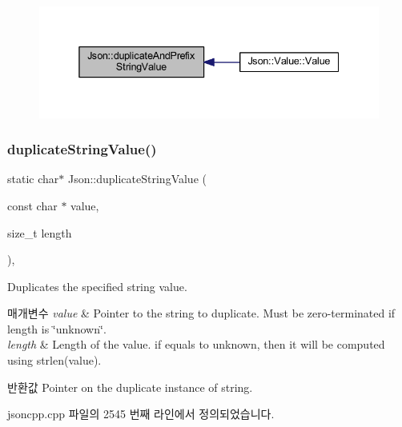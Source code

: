 \begin{figure}[H]
\begin{center}
\leavevmode
\includegraphics[width=338pt]{namespace_json_a9795a09a0141d1f12d307c4386aeaee6_icgraph}
\end{center}
\end{figure}
\mbox{\label{namespace_json_a678ac3a60cd70ec0fb4c9abfd40eb0c4}} 
\subsubsection{\texorpdfstring{duplicate\+String\+Value()}{duplicateStringValue()}}
{\footnotesize\ttfamily static char$\ast$ Json\+::duplicate\+String\+Value (\begin{DoxyParamCaption}\item[{const char $\ast$}]{value,  }\item[{size\+\_\+t}]{length }\end{DoxyParamCaption})\hspace{0.3cm}{\ttfamily [inline]}, {\ttfamily [static]}}

Duplicates the specified string value. 
\begin{DoxyParams}{매개변수}
{\em value} & Pointer to the string to duplicate. Must be zero-\/terminated if length is \char`\"{}unknown\char`\"{}. \\
\hline
{\em length} & Length of the value. if equals to unknown, then it will be computed using strlen(value). \\
\hline
\end{DoxyParams}
\begin{DoxyReturn}{반환값}
Pointer on the duplicate instance of string. 
\end{DoxyReturn}


jsoncpp.\+cpp 파일의 2545 번째 라인에서 정의되었습니다.


